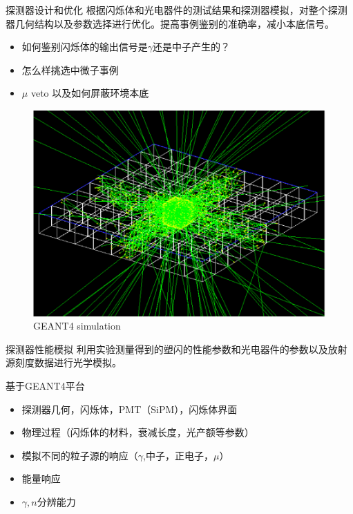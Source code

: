 \documentclass[11pt,compress,xcolor=x11names,UTF8]{beamer}
\begin{document}
\begin{frame}{探测器设计和优化}
根据闪烁体和光电器件的测试结果和探测器模拟，对整个探测器几何结构以及参数选择进行优化。提高事例鉴别的准确率，减小本底信号。
\begin{itemize}
\item 如何鉴别闪烁体的输出信号是$\gamma$还是中子产生的？
\item 怎么样挑选中微子事例 
\item $\mu$ veto 以及如何屏蔽环境本底
\end{itemize}
\begin{figure}
\centering
\includegraphics[width=.6\textwidth]{g4sim} %
\caption{GEANT4 simulation}
\end{figure}
\end{frame}
\begin{frame}{探测器性能模拟}
利用实验测量得到的塑闪的性能参数和光电器件的参数以及放射源刻度数据进行光学模拟。

基于GEANT4平台
\begin{itemize}
\item 探测器几何，闪烁体，PMT（SiPM），闪烁体界面
\item 物理过程（闪烁体的材料，衰减长度，光产额等参数）
\item 模拟不同的粒子源的响应（$\gamma$,中子，正电子，$\mu$）
\item 能量响应
\item $\gamma,n$分辨能力
\end{itemize}
\end{frame}
\end{document}
